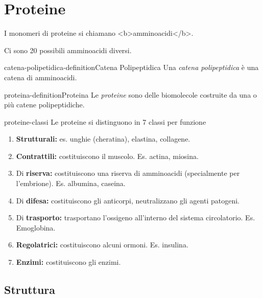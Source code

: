 \documentclass[preview]{standalone}
\begin{document}
\genpage

\section{Proteine}

\begin{plainhtml}
    I monomeri di proteine si chiamano <b>amminoacidi</b>.
\end{plainhtml}

\begin{plainhtml}
    Ci sono 20 possibili amminoacidi diversi.
\end{plainhtml}

\begin{snippetdefinition}{catena-polipetidica-definition}{Catena Polipeptidica}
    Una \textit{catena polipeptidica} è una catena di amminoacidi.
\end{snippetdefinition}

\begin{snippetdefinition}{proteina-definition}{Proteina}
    Le \textit{proteine} sono delle biomolecole costruite
    da una o più catene polipeptidiche.
\end{snippetdefinition}

\begin{snippet}{proteine-classi}
    Le proteine si distinguono in 7 classi per funzione
    \begin{enumerate}
        \item \textbf{Strutturali:} es. unghie (cheratina), elastina, collagene.
        \item \textbf{Contrattili:} costituiscono il muscolo. Es. actina, miosina.
        \item Di \textbf{riserva:} costituiscono una riserva di amminoacidi (specialmente per l'embrione).
        Es. albumina, caseina.
        \item Di \textbf{difesa:} costituiscono gli anticorpi, neutralizzano gli agenti patogeni.
        \item Di \textbf{trasporto:} trasportano l'ossigeno all'interno del sistema circolatorio. Es. Emoglobina.
        \item \textbf{Regolatrici:} costituiscono alcuni ormoni. Es. insulina.
        \item \textbf{Enzimi:} costituiscono gli enzimi.
    \end{enumerate}
\end{snippet}

\subsection{Struttura}
\end{document}

